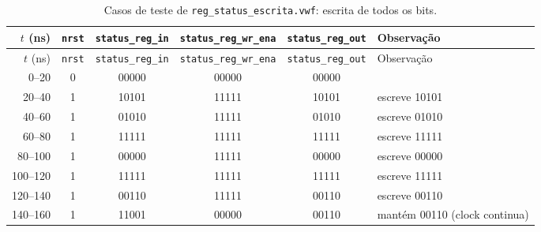 {\scriptsize\setlength{\tabcolsep}{3pt}
\begin{longtable}{rccccp{4.4cm}}
\caption{Casos de teste de \texttt{reg\_status\_escrita.vwf}: escrita de todos os bits.}
\label{tab:caso-reg-status-escrita}\\
\hline $t$ (ns) & \texttt{nrst} & \texttt{status\_reg\_in} & \texttt{status\_reg\_wr\_ena} & \texttt{status\_reg\_out} & Observação \\ \hline \endfirsthead
\hline $t$ (ns) & \texttt{nrst} & \texttt{status\_reg\_in} & \texttt{status\_reg\_wr\_ena} & \texttt{status\_reg\_out} & Observação \\ \hline \endhead
0--20 & 0 & 00000 & 00000 & 00000 &  \\
20--40 & 1 & 10101 & 11111 & 10101 & escreve 10101 \\
40--60 & 1 & 01010 & 11111 & 01010 & escreve 01010 \\
60--80 & 1 & 11111 & 11111 & 11111 & escreve 11111 \\
80--100 & 1 & 00000 & 11111 & 00000 & escreve 00000 \\
100--120 & 1 & 11111 & 11111 & 11111 & escreve 11111 \\
120--140 & 1 & 00110 & 11111 & 00110 & escreve 00110 \\
140--160 & 1 & 11001 & 00000 & 00110 & mantém 00110 (clock continua) \\
\hline
\end{longtable}}
\vspace{-0.9cm}
